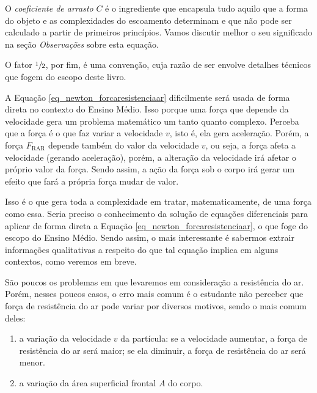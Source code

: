 O \textit{coeficiente de arrasto} $C$ é o ingrediente que encapsula tudo aquilo que a forma do objeto e as complexidades do escoamento determinam e que não pode ser calculado a partir de primeiros princípios. Vamos discutir melhor o seu significado na seção \emph{Observações} sobre esta equação.

O fator $\sfrac{1}{2}$, por fim, é uma convenção, cuja razão de ser envolve detalhes técnicos que fogem do escopo deste livro.







A Equação \eqref{eq_newton_forcaresistenciaar} dificilmente será usada de forma direta no contexto do Ensino Médio. Isso porque uma força que depende da velocidade gera um problema matemático um tanto quanto complexo. Perceba que a força é o que faz variar a velocidade $v$, isto é, ela gera aceleração. Porém, a força $F_{\text{RAR}}$ depende também do valor da velocidade $v$, ou seja, a força afeta a velocidade (gerando aceleração), porém, a alteração da velocidade irá afetar o próprio valor da força. Sendo assim, a ação da força sob o corpo irá gerar um efeito que fará a própria força mudar de valor.

Isso é o que gera toda a complexidade em tratar, matematicamente, de uma força como essa. Seria preciso o conhecimento da solução de equações diferenciais para aplicar de forma direta a Equação \eqref{eq_newton_forcaresistenciaar}, o que foge do escopo do Ensino Médio. Sendo assim, o mais interessante é sabermos extrair informações qualitativas a respeito do que tal equação implica em alguns contextos, como veremos em breve.



São poucos os problemas em que levaremos em consideração a resistência do ar. Porém, nesses poucos casos, o erro mais comum é o estudante não perceber que força de resistência do ar pode variar por diversos motivos, sendo o mais comum deles:

\begin{enumerate}
    \item [(i)] a variação da velocidade $v$ da partícula: se a velocidade aumentar, a força de resistência do ar será maior; se ela diminuir, a força de resistência do ar será menor.

    \item [(ii)] a variação da área superficial frontal $A$ do corpo.
\end{enumerate}

